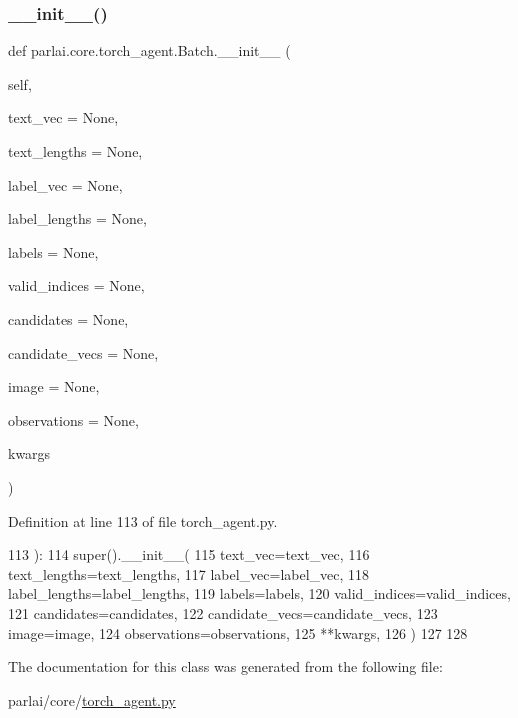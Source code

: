 \subsubsection{\texorpdfstring{\+\_\+\+\_\+init\+\_\+\+\_\+()}{\_\_init\_\_()}}
{\footnotesize\ttfamily def parlai.\+core.\+torch\+\_\+agent.\+Batch.\+\_\+\+\_\+init\+\_\+\+\_\+ (\begin{DoxyParamCaption}\item[{}]{self,  }\item[{}]{text\+\_\+vec = {\ttfamily None},  }\item[{}]{text\+\_\+lengths = {\ttfamily None},  }\item[{}]{label\+\_\+vec = {\ttfamily None},  }\item[{}]{label\+\_\+lengths = {\ttfamily None},  }\item[{}]{labels = {\ttfamily None},  }\item[{}]{valid\+\_\+indices = {\ttfamily None},  }\item[{}]{candidates = {\ttfamily None},  }\item[{}]{candidate\+\_\+vecs = {\ttfamily None},  }\item[{}]{image = {\ttfamily None},  }\item[{}]{observations = {\ttfamily None},  }\item[{}]{kwargs }\end{DoxyParamCaption})}



Definition at line 113 of file torch\+\_\+agent.\+py.


\begin{DoxyCode}
113     ):
114         super().\_\_init\_\_(
115             text\_vec=text\_vec,
116             text\_lengths=text\_lengths,
117             label\_vec=label\_vec,
118             label\_lengths=label\_lengths,
119             labels=labels,
120             valid\_indices=valid\_indices,
121             candidates=candidates,
122             candidate\_vecs=candidate\_vecs,
123             image=image,
124             observations=observations,
125             **kwargs,
126         )
127 
128 
\end{DoxyCode}


The documentation for this class was generated from the following file\+:\begin{DoxyCompactItemize}
\item 
parlai/core/\hyperlink{torch__agent_8py}{torch\+\_\+agent.\+py}\end{DoxyCompactItemize}
